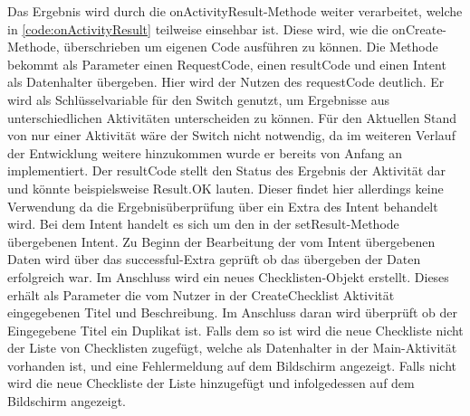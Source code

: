 Das Ergebnis wird durch die onActivityResult-Methode weiter verarbeitet, welche in \autoref{code:onActivityResult} teilweise einsehbar ist. Diese wird, wie die onCreate-Methode, überschrieben um eigenen Code ausführen zu können. Die Methode bekommt als Parameter einen RequestCode, einen resultCode und einen Intent als Datenhalter übergeben. Hier wird der Nutzen des requestCode deutlich. Er wird als Schlüsselvariable für den Switch genutzt, um Ergebnisse aus unterschiedlichen Aktivitäten unterscheiden zu können. Für den Aktuellen Stand von nur einer Aktivität wäre der Switch nicht notwendig, da im weiteren Verlauf der Entwicklung weitere hinzukommen wurde er bereits von Anfang an implementiert. Der resultCode stellt den Status des Ergebnis der Aktivität dar und könnte beispielsweise Result.OK lauten. Dieser findet hier allerdings keine Verwendung da die Ergebnisüberprüfung über ein Extra des Intent behandelt wird. Bei dem Intent handelt es sich um den in der setResult-Methode übergebenen Intent. Zu Beginn der Bearbeitung der vom Intent übergebenen Daten wird über das \glqq successful\grqq{}-Extra geprüft ob das übergeben der Daten erfolgreich war. Im Anschluss wird ein neues Checklisten-Objekt erstellt. Dieses erhält als Parameter die vom Nutzer in der CreateChecklist Aktivität eingegebenen Titel und Beschreibung. Im Anschluss daran wird überprüft ob der Eingegebene Titel ein Duplikat ist. Falls dem so ist wird die neue Checkliste nicht der Liste von Checklisten zugefügt, welche als Datenhalter in der Main-Aktivität vorhanden ist, und eine Fehlermeldung auf dem Bildschirm angezeigt. Falls nicht wird die neue Checkliste der Liste hinzugefügt und infolgedessen auf dem Bildschirm angezeigt.
\\




